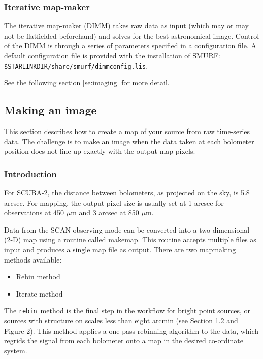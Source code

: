 \documentclass[twoside,11pt]{article}
\newcommand{\xref}[3]{#1}
\newcommand{\xlabel}[1]{}
\renewcommand{\_}{\texttt{\symbol{95}}}
\newcommand{\task}[1]{\textsf{#1}}
\newcommand{\makemap}{\xref{\task{makemap}}{sun258}{MAKEMAP}}
\newcommand{\rebin}{\texttt{rebin}}
\begin{document}
\subsubsection{\xlabel{iterate}Iterative map-maker\label{se:iterate}}

The iterative map-maker (DIMM) takes raw data as input (which may or
may not be flatfielded beforehand) and solves for the best
astronomical image. Control of the DIMM is through a series of
parameters specified in a configuration file. A default configuration
file is provided with the installation of SMURF:
\texttt{\$STARLINK\_DIR/share/smurf/dimmconfig.lis}.

See the following section \ref{se:imaging} for more detail.

\subsection{\xlabel{imaging}Making an image\label{se:imaging}}

This section describes how to create a map of your source from raw
time-series data. The challenge is to make an image when the data
taken at each bolometer position does not line up exactly with the
output map pixels.

\subsubsection{Introduction}

For SCUBA-2, the distance between bolometers, as projected on the sky,
is 5.8 arcsec. For mapping, the output pixel size is usually set at 1
arcsec for observations at 450 $\mu$m and 3 arcsec at 850 $\mu$m.

Data from the SCAN observing mode can be converted into a
two-dimensional (2-D) map using a routine called \makemap. This
routine accepts multiple files as input and produces a single map file
as output. There are two mapmaking methods available:
\begin{itemize}
\item Rebin method
\item Iterate method
\end{itemize}

The \rebin\ method is the final step in the workflow for bright point
sources, or sources with structure on scales less than eight arcmin
(see Section 1.2 and Figure 2). This method applies a one-pass
rebinning algorithm to the data, which regrids the signal from each
bolometer onto a map in the desired co-ordinate system.
\end{document}
